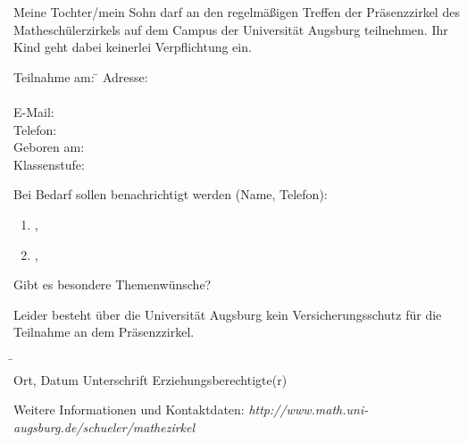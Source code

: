 \documentclass{mamazettel}
\begin{document}
\renewcommand{\betreff}{Anmeldung zum Matheschülerzirkel der Universität Augsburg}

\makeletterhead

Meine Tochter/mein Sohn \freistLang{} darf an den regelmäßigen Treffen der
Präsenzzirkel des Matheschülerzirkels auf dem Campus der Universität Augsburg
teilnehmen. Ihr Kind geht dabei keinerlei Verpflichtung ein.

\vspace{-0.5em}
\doublespacing
\begin{tabbing}
  Teilnahme am: \= \kill
  Adresse: \> \freistLang \\
  \> \freistLang \\
  E-Mail: \> \freistLang \\
  Telefon: \> \freistLang \\
  Geboren am: \> \freistLang \\
  Klassenstufe: \> \freistKurz
\end{tabbing}

Bei Bedarf sollen benachrichtigt werden (Name, Telefon):
\begin{enumerate}
\item \freist{7cm},\quad\freist{7cm}
\item \freist{7cm},\quad\freist{7cm}
\end{enumerate}

\vspace{1em}
Gibt es besondere Themenwünsche?
\freist{10cm}

\singlespacing


Leider besteht \"uber die Universit\"at Augsburg kein Versicherungsschutz f\"ur die Teilnahme an dem Pr\"asenzzirkel. 

\vfill

\begin{tabbing}
  \freistMittel \qquad\qquad \= \kill
  \freistMittel \> \freistLaenger \\
  Ort, Datum \> Unterschrift Erziehungsberechtigte(r)
\end{tabbing}

\scriptsize
Weitere Informationen und Kontaktdaten:
\textsl{http:/\!/www.math.uni-augsburg.de/schueler/mathezirkel}
\end{document}
